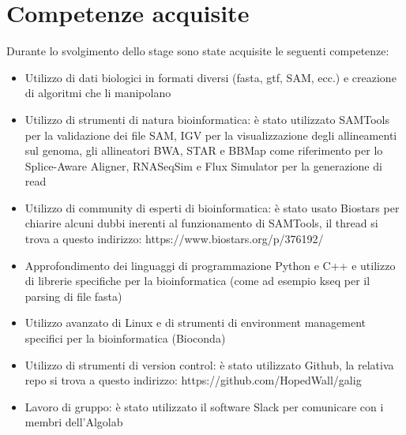 \section{Competenze acquisite}
Durante lo svolgimento dello stage sono state acquisite le seguenti competenze:

\begin{itemize}
	\item Utilizzo di dati biologici in formati diversi (fasta, gtf, SAM, ecc.) e creazione di algoritmi che li manipolano
	\item Utilizzo di strumenti di natura bioinformatica: è stato utilizzato SAMTools per la validazione dei file SAM, IGV per la visualizzazione degli allineamenti sul genoma, gli allineatori BWA, STAR e BBMap come riferimento per lo Splice-Aware Aligner, RNASeqSim e Flux Simulator per la generazione di read
	\item Utilizzo di community di esperti di bioinformatica: è stato usato Biostars per chiarire alcuni dubbi inerenti al funzionamento di SAMTools, il thread si trova a questo indirizzo: https://www.biostars.org/p/376192/
	\item Approfondimento dei linguaggi di programmazione Python e C++ e utilizzo di librerie specifiche per la bioinformatica (come ad esempio kseq per il parsing di file fasta)
	\item Utilizzo avanzato di Linux e di strumenti di environment management specifici per la bioinformatica (Bioconda)
	\item Utilizzo di strumenti di version control: è stato utilizzato Github, la relativa repo si trova a questo indirizzo: https://github.com/HopedWall/galig
	\item Lavoro di gruppo: è stato utilizzato il software Slack per comunicare con i membri dell'Algolab
\end{itemize}